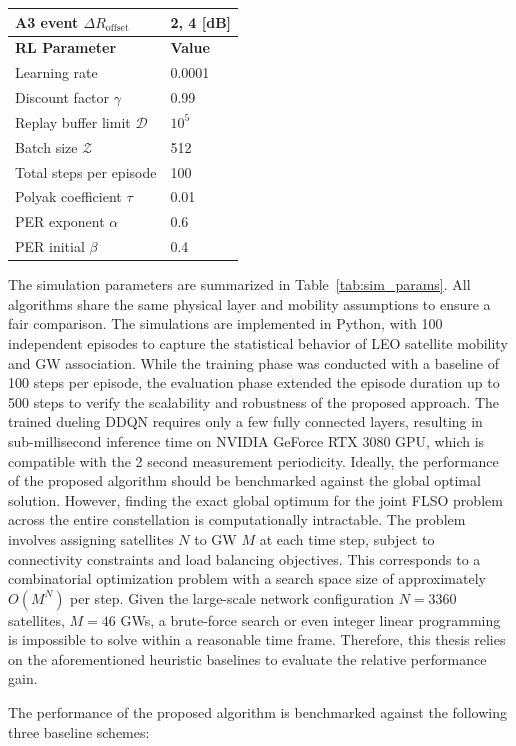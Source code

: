 \begin{table}[p]
\begin{tabular}{l l}
A3 event $\Delta R_{\text{offset}}$ & 2, 4 [dB] \\
\hline
\textbf{RL Parameter} & \textbf{Value} \\
\hline
Learning rate & 0.0001 \\
Discount factor $\gamma$ & 0.99 \\
Replay buffer limit $\mathcal{D}$ & $10^5$ \\
Batch size $\mathcal{Z}$ & 512 \\
Total steps per episode & 100 \\
Polyak coefficient $\tau$ & 0.01 \\
PER exponent $\alpha$ & 0.6 \\
PER initial $\beta$ & 0.4 \\
\hline
\end{tabular}
\end{table}
The simulation parameters are summarized in Table~\ref{tab:sim_params}. All algorithms share the same physical layer and mobility assumptions to ensure a fair comparison. The simulations are implemented in Python, with 100 independent episodes to capture the statistical behavior of LEO satellite mobility and GW association. While the training phase was conducted with a baseline of 100 steps per episode, the evaluation phase extended the episode duration up to 500 steps to verify the scalability and robustness of the proposed approach. The trained dueling DDQN requires only a few fully connected layers, resulting in sub-millisecond inference time on NVIDIA GeForce RTX 3080 GPU, which is compatible with the 2 second measurement periodicity. Ideally, the performance of the proposed algorithm should be benchmarked against the global optimal solution. However, finding the exact global optimum for the joint FLSO problem across the entire constellation is computationally intractable. The problem involves assigning satellites $N$ to GW $M$ at each time step, subject to connectivity constraints and load balancing objectives. This corresponds to a combinatorial optimization problem with a search space size of approximately $O(M^N)$ per step. Given the large-scale network configuration $N=3360$ satellites, $M=46$ GWs, a brute-force search or even integer linear programming is impossible to solve within a reasonable time frame. Therefore, this thesis relies on the aforementioned heuristic baselines to evaluate the relative performance gain.

The performance of the proposed algorithm is benchmarked against the following three baseline schemes:

